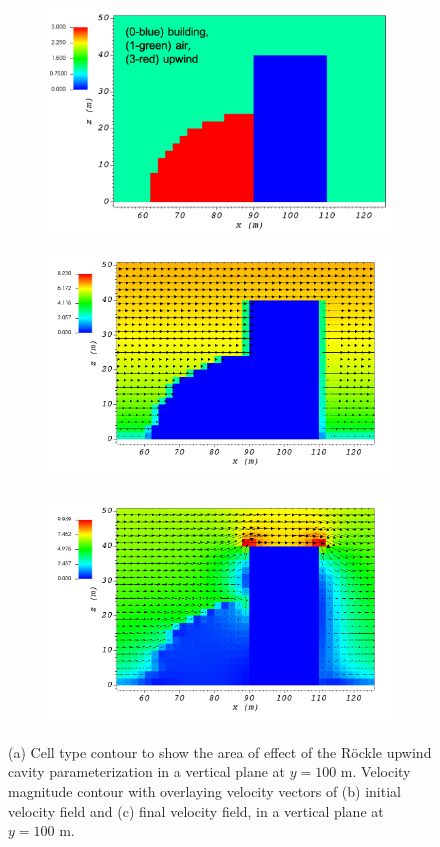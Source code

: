 \begin{figure}[H]
    \centering
    \begin{subfigure}{\textwidth}
    \centering
    \includegraphics[width=10.3cm,keepaspectratio]{Images/upwind_y_100_1_init_icell.png}
    \caption{}
    \end{subfigure}
    \begin{subfigure}{\textwidth}
    \centering
    \includegraphics[width=11.0cm,keepaspectratio]{Images/upwind_y_100_1_init_vel.png}
    \caption{}
    \end{subfigure}
    \begin{subfigure}{\textwidth}
    \centering
    \includegraphics[width=11.0cm,keepaspectratio]{Images/upwind_y_100_1_final.png}
    \caption{}
    \end{subfigure}
    \caption{(a) Cell type contour to show the area of effect of the R\"{o}ckle upwind cavity parameterization in a vertical plane at $y=100$ m. Velocity magnitude contour with overlaying velocity vectors of (b) initial velocity field and (c) final velocity field, in a vertical plane at $y=100$ m.}
\end{figure}

